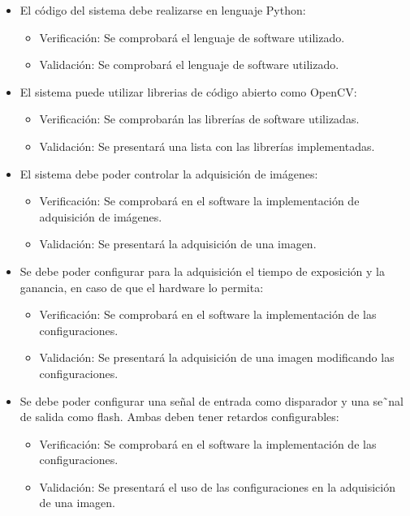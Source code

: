 \documentclass[
11pt, %
codirector, %
]{charter}
\begin{document}
\begin{itemize}
	\item \REQ El código del sistema debe realizarse en lenguaje Python:
	\begin{itemize}
		\item Verificación: Se comprobará el lenguaje de software utilizado.
		\item Validación: Se comprobará el lenguaje de software utilizado.
	\end{itemize}
	
	\item \REQ El sistema puede utilizar librerias de código abierto como OpenCV:
	\begin{itemize}
		\item Verificación: Se comprobarán las librerías de software utilizadas.
		\item Validación: Se presentará una lista con las librerías implementadas.
	\end{itemize}
	
	\item \REQ El sistema debe poder controlar la adquisición de imágenes:
	\begin{itemize}
		\item Verificación: Se comprobará en el software la implementación de adquisición de imágenes.
		\item Validación: Se presentará la adquisición de una imagen.
	\end{itemize}
	
	\item \REQ Se debe poder configurar para la adquisición el tiempo de exposición y la ganancia, en caso de que el hardware lo permita:
	\begin{itemize}
		\item Verificación: Se comprobará en el software la implementación de las configuraciones.
		\item Validación: Se presentará la adquisición de una imagen modificando las configuraciones.
	\end{itemize}
	
	\item \REQ Se debe poder configurar una señal de entrada como disparador y una se˜nal de salida como flash. Ambas deben tener retardos configurables:
	\begin{itemize}
		\item Verificación: Se comprobará en el software la implementación de las configuraciones.
		\item Validación: Se presentará el uso de las configuraciones en la adquisición de una imagen.
	\end{itemize}
	

\end{itemize}
\end{document}
